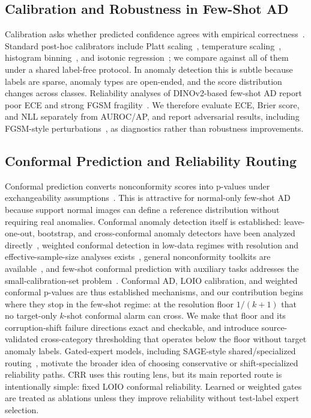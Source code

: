 \subsection{Calibration and Robustness in Few-Shot AD}
Calibration asks whether predicted confidence agrees with empirical correctness~\cite{platt1999,guo2017calibration}. Standard post-hoc calibrators include Platt scaling~\cite{platt1999}, temperature scaling~\cite{guo2017calibration}, histogram binning~\cite{zadrozny2001obtaining}, and isotonic regression~\cite{zadrozny2002transforming}; we compare against all of them under a shared label-free protocol. In anomaly detection this is subtle because labels are sparse, anomaly types are open-ended, and the score distribution changes across classes. Reliability analyses of DINOv2-based few-shot AD report poor ECE and strong FGSM fragility~\cite{khan2025calibration}. We therefore evaluate ECE, Brier score, and NLL separately from AUROC/AP, and report adversarial results, including FGSM-style perturbations~\cite{goodfellow2015}, as diagnostics rather than robustness improvements.

\subsection{Conformal Prediction and Reliability Routing}
Conformal prediction converts nonconformity scores into p-values under exchangeability assumptions~\cite{vovk2005,shafer2008tutorial,angelopoulos2021gentle}. This is attractive for normal-only few-shot AD because support normal images can define a reference distribution without requiring real anomalies. Conformal anomaly detection itself is established: leave-one-out, bootstrap, and cross-conformal anomaly detectors have been analyzed directly~\cite{hennhofer2024loio}, weighted conformal detection in low-data regimes with resolution and effective-sample-size analyses exists~\cite{hennhofer2026weighted}, general nonconformity toolkits are available~\cite{hennhofer2026nonconform}, and few-shot conformal prediction with auxiliary tasks addresses the small-calibration-set problem~\cite{fisch2021fewshot}. Conformal AD, LOIO calibration, and weighted conformal p-values are thus established mechanisms, and our contribution begins where they stop in the few-shot regime: at the resolution floor $1/(k{+}1)$ that no target-only $k$-shot conformal alarm can cross. We make that floor and its corruption-shift failure directions exact and checkable, and introduce source-validated cross-category thresholding that operates below the floor without target anomaly labels. Gated-expert models, including SAGE-style shared/specialized routing~\cite{Thai_2026_CVPR}, motivate the broader idea of choosing conservative or shift-specialized reliability paths. CRR uses this routing lens, but its main reported route is intentionally simple: fixed LOIO conformal reliability. Learned or weighted gates are treated as ablations unless they improve reliability without test-label expert selection.
